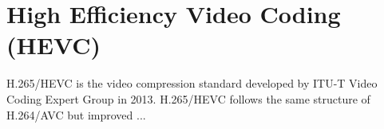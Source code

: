 \section{High Efficiency Video Coding (HEVC)}
\label{sec:background/section_c}

H.265/HEVC is the video compression standard developed by ITU-T Video Coding Expert Group in 2013. H.265/HEVC follows the same structure of H.264/AVC but improved ...